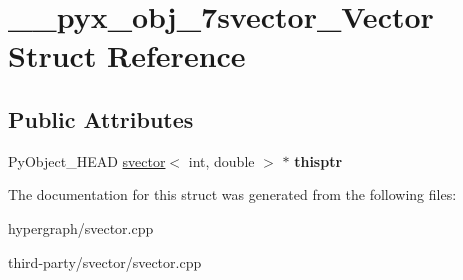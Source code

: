 \hypertarget{struct____pyx__obj__7svector__Vector}{
\section{\_\-\_\-pyx\_\-obj\_\-7svector\_\-Vector Struct Reference}
\label{struct____pyx__obj__7svector__Vector}
}
\subsection*{Public Attributes}
\begin{DoxyCompactItemize}
\item 
\hypertarget{struct____pyx__obj__7svector__Vector_af079a183d80d335744c531c224658a16}{
PyObject\_\-HEAD \hyperlink{classsvector}{svector}$<$ int, double $>$ $\ast$ {\bfseries thisptr}}
\label{struct____pyx__obj__7svector__Vector_af079a183d80d335744c531c224658a16}

\end{DoxyCompactItemize}


The documentation for this struct was generated from the following files:\begin{DoxyCompactItemize}
\item 
hypergraph/svector.cpp\item 
third-\/party/svector/svector.cpp\end{DoxyCompactItemize}
